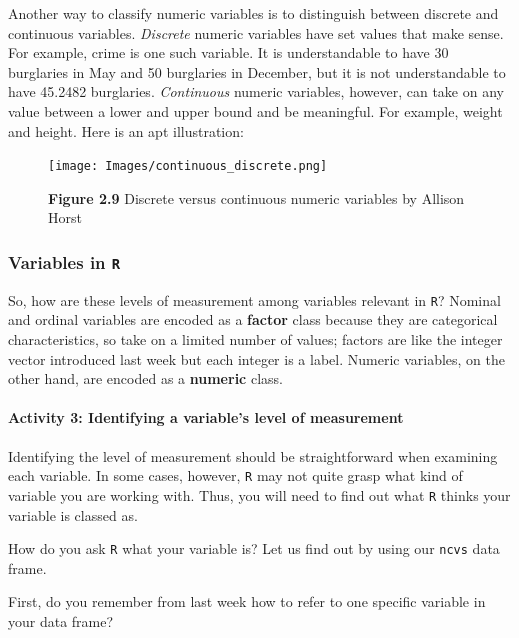 \documentclass[
]{book}
\begin{document}
Another way to classify numeric variables is to distinguish between discrete and continuous variables. \emph{Discrete} numeric variables have set values that make sense. For example, crime is one such variable. It is understandable to have 30 burglaries in May and 50 burglaries in December, but it is not understandable to have 45.2482 burglaries. \emph{Continuous} numeric variables, however, can take on any value between a lower and upper bound and be meaningful. For example, weight and height. Here is an apt illustration:

\begin{figure}
\centering
\texttt{[image: Images/continuous\_discrete.png]}
\caption{\textbf{Figure 2.9} Discrete versus continuous numeric variables by Allison Horst}
\end{figure}

\hypertarget{variables-in-r}{%
\subsubsection{\texorpdfstring{Variables in \texttt{R}}{Variables in R}}\label{variables-in-r}}

So, how are these levels of measurement among variables relevant in \texttt{R}? Nominal and ordinal variables are encoded as a \textbf{factor} class because they are categorical characteristics, so take on a limited number of values; factors are like the integer vector introduced last week but each integer is a label. Numeric variables, on the other hand, are encoded as a \textbf{numeric} class.

\hypertarget{activity-3-identifying-a-variables-level-of-measurement}{%
\paragraph{Activity 3: Identifying a variable's level of measurement}\label{activity-3-identifying-a-variables-level-of-measurement}}

Identifying the level of measurement should be straightforward when examining each variable. In some cases, however, \texttt{R} may not quite grasp what kind of variable you are working with. Thus, you will need to find out what \texttt{R} thinks your variable is classed as.

How do you ask \texttt{R} what your variable is? Let us find out by using our \texttt{ncvs} data frame.

First, do you remember from last week how to refer to one specific variable in your data frame?
\end{document}
